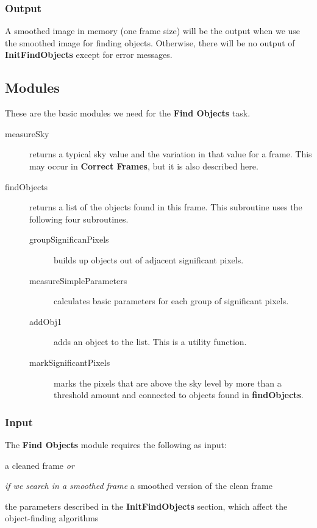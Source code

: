 \subsubsection{Output}           

A smoothed image in memory (one frame size) will be the output when 
we use the smoothed image for finding objects.  
Otherwise, there will be no output of {\bf InitFindObjects} except for 
error messages.

\subsection {Modules}

These are the basic modules we need for the {\bf Find Objects} task.

\begin{description}
  \item[\quad measureSky] returns a typical sky value and the variation in
          that value for a frame.  This may occur in {\bf Correct Frames}, 
          but it is also described here. 
  \item[\quad findObjects] returns a list of the objects found in this frame.
          This subroutine uses the following four subroutines.
  \begin{description}
     \item[\quad groupSignificanPixels] builds up objects out of adjacent 
             significant pixels.
     \item[\quad measureSimpleParameters] calculates basic parameters for each 
             group of significant pixels.
     \item[\quad addObj1] adds an object to the list. 
             This is a utility function.
     \item[\quad markSignificantPixels] marks the pixels that are above 
             the sky level by more than a threshold amount and 
             connected to objects found in {\bf findObjects}. 
  \end{description}
\end{description}

\subsubsection{Input}           

The {\bf Find Objects} module requires the following as input:

\begin{description}
  \item a cleaned frame {\it or}
  \item {\it if we search in a smoothed frame} a smoothed version of
          the clean frame
  \item the parameters described in the {\bf InitFindObjects} section,
          which affect the object-finding algorithms
\end{description}

